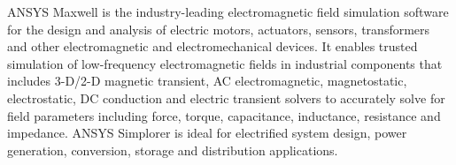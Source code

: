 ANSYS Maxwell is the industry-leading electromagnetic field simulation software for the design and analysis of electric motors, actuators, sensors, transformers and other electromagnetic and electromechanical devices. It enables trusted simulation of low-frequency electromagnetic fields in industrial components that includes 3-D/2-D magnetic transient, AC electromagnetic, magnetostatic, electrostatic, DC conduction and electric transient solvers to accurately solve for field parameters including force, torque, capacitance, inductance, resistance and impedance. ANSYS Simplorer is ideal for electrified system design, power generation, conversion, storage and distribution applications.
